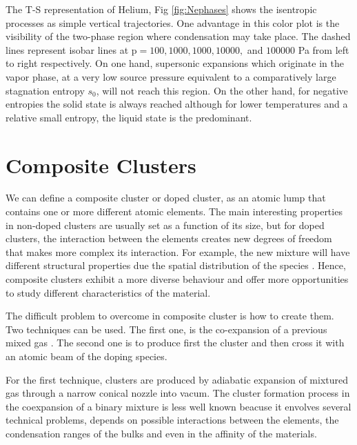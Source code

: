 The T-S representation of Helium, Fig \ref{fig:Nephases} shows the isentropic processes as simple vertical trajectories. One advantage in this color plot is the visibility of the two-phase region where condensation may take place. The dashed lines represent isobar lines at p$= 100,1000,1000,10000,$ and $100000$ Pa from left to right respectively. On one hand, supersonic expansions which originate in the vapor phase, at a very low source pressure equivalent to a comparatively large stagnation entropy $s_{0}$, will not reach this region. On the other hand, for negative entropies the solid state is always reached although for lower temperatures and a relative small entropy, the liquid state is the predominant.\cite{christen_supersonic_2010-1} 

\section{Composite Clusters}

We can define a composite cluster or doped cluster, as an atomic lump that contains one or more different atomic elements. The main interesting properties in non-doped clusters are usually set as a function of its size, but for doped clusters, the interaction between the elements creates new degrees of freedom that makes more complex its interaction. For example, the new mixture will have different structural properties due the spatial distribution of the species \cite{stienkemeier_spectroscopy_2006}. Hence, composite clusters exhibit a more diverse behaviour and offer more opportunities to study different characteristics of the material.

The difficult problem to overcome in composite cluster is how to create them. Two techniques can be used. The first one, is the co-expansion of a previous mixed gas \cite{tchaplyguine_variable_2004}. The second one is to produce first the cluster and then cross it with an atomic beam of the doping species.

For the first technique, clusters are produced by adiabatic expansion of mixtured gas through  a  narrow  conical  nozzle into vacum\cite{tchaplyguine_variable_2004}. The  cluster  formation  process  in  the coexpansion of a binary mixture is less well known beacuse it envolves several technical problems, depends on possible interactions between the elements, the condensation ranges of the bulks and even in the affinity  of the materials\cite{reinhard_introduction_2004}.

